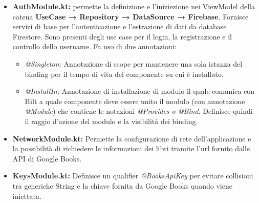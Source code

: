 \documentclass{article}
\begin{document}
\begin{itemize}
  \item \textbf{AuthModule.kt:} permette la definizione e l'iniziezione nei ViewModel della catena \textbf{UseCase → Repository → DataSource → Firebase}.
  Fornisce servizi di base per l'autenticazione e l'estrazione di dati da database Firestore. Sono presenti degli use case per il login, la registrazione e il controllo dello username.
  Fa uso di due annotazioni:
  \begin{itemize}
    \item \textit{@Singleton:} Annotazione di scope per mantenere una sola istanza del binding per il tempo di vita del componente su cui è installato.
    \item \textit{@InstallIn:} Annotazione di installazione di modulo il quale comunica con Hilt a quale componente deve essere unito il modulo (con annotazione \textit{@Module}) che contiene le notazioni \textit{@Provides o @Bind}.
    Definisce quindi il raggio d'azione del modulo e la visibilità dei binding.
  \end{itemize}
  \item \textbf{NetworkModule.kt:} Permette la configurazione di rete dell'applicazione e la possibilità di richiedere le informazioni dei libri tramite l'url fornito dalle API di Google Books.
  \item \textbf{KeysModule.kt:} Definisce un qualifier \textit{@BooksApiKey} per evitare collisioni tra generiche String e la chiave fornita da Google Books quando viene iniettata.
\end{itemize}
\end{document}

